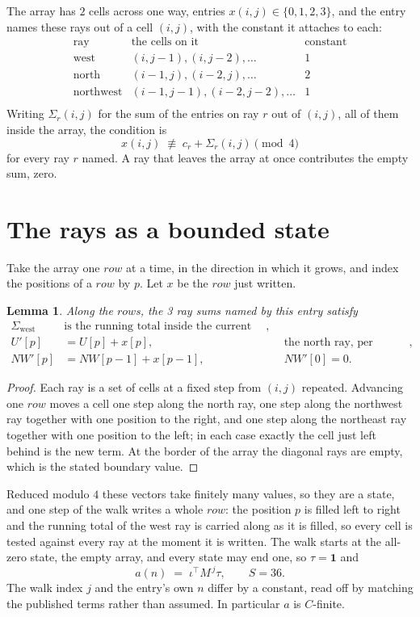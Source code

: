\documentclass[11pt,a4paper]{article}
\theoremstyle{plain}
\newtheorem{lemma}[theorem]{Lemma}
\theoremstyle{definition}
\begin{document}
The array has $2$ cells across one way, entries $x(i,j)\in\{0,1,2,3\}$, and the entry names these
rays out of a cell $(i,j)$, with the constant it attaches to each:
\[
\begin{array}{lll}
\text{ray} & \text{the cells on it} & \text{constant} \\[2pt]
\text{west} & (i,j-1),(i,j-2),\dots & 1 \\
\text{north} & (i-1,j),(i-2,j),\dots & 2 \\
\text{northwest} & (i-1,j-1),(i-2,j-2),\dots & 1 \\
\end{array}
\]
Writing $\Sigma_r(i,j)$ for the sum of the entries on ray $r$ out of $(i,j)$, all of them
inside the array, the condition is
\[
x(i,j)\;\not\equiv\;c_r+\Sigma_r(i,j) \pmod{4}
\]
for every ray $r$ named. A ray that leaves the array at once contributes the empty sum,
zero.

\section{The rays as a bounded state}

Take the array one $row$ at a time, in the direction in which it grows, and index the
positions of a $row $ by $p$. Let $x$ be the $row$ just written.

\begin{lemma}\label{lem:rays}
Along the $row$s, the 3 ray sums named by this entry satisfy
\[
\begin{aligned}
\Sigma_{\mathrm{west}}\ &\text{is the running total inside the current row},\\
U'[p]&=U[p]+x[p], &&\text{the north ray, per position},\\
NW'[p]&=NW[p-1]+x[p-1], && NW'[0]=0 .
\end{aligned}
\]
\end{lemma}

\begin{proof}
Each ray is a set of cells at a fixed step from $(i,j)$ repeated. Advancing one $row$
moves a cell one step along the north ray, one step along the northwest ray together with one
position to the right, and one step along the northeast ray together with one position to the
left; in each case exactly the cell just left behind is the new term. At the border of the
array the diagonal rays are empty, which is the stated boundary value.
\end{proof}

Reduced modulo $4$ these vectors take finitely many values, so they are a state, and one step
of the walk writes a whole $row$: the position $p$ is filled left to right and the
running total of the west ray is carried along as it is filled, so every cell is tested
against every ray at the moment it is written. The walk starts at the all-zero state, the empty
array, and every state may end one, so $\tau=\mathbf{1}$ and
\[
a(n)\;=\;\iota^{\!\top}M^{\,j}\tau ,\qquad S=36.
\]
The walk index $j$ and the entry's own $n$ differ by a constant, read off by matching the
published terms rather than assumed. In particular $a$ is $C$-finite.
\end{document}
